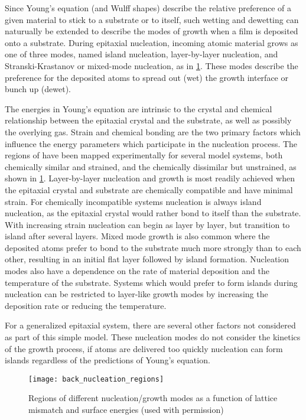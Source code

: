Since Young's equation (and Wulff shapes) describe the relative preference of a given material to stick to a substrate or to itself, such wetting and dewetting can naturually be extended to describe the modes of growth when a film is deposited onto a substrate. During epitaxial nucleation, incoming atomic material grows as one of three modes, named island nucleation, layer-by-layer nucleation, and Stranski-Krastanov or mixed-mode nucleation\cite{Venables1984}, as in \cref{fig:back_nucleation_regions}. These modes describe the preference for the deposited atoms to spread out (wet) the growth interface or bunch up (dewet).

 The energies in Young's equation are intrinsic to the crystal and chemical relationship between the epitaxial crystal and the substrate, as well as possibly the overlying gas. Strain and chemical bonding are the two primary factors which influence the energy parameters which participate in the nucleation process. The regions of have been mapped experimentally for several model systems, both chemically similar and strained, and the chemically dissimilar but unstrained, as shown in \cref{fig:back_nucleation_regions}. Layer-by-layer nucleation and growth is most readily achieved when the epitaxial crystal and substrate are chemically compatible and have minimal strain\cite{Venables1984}. For chemically incompatible systems nucleation is always island nucleation, as the epitaxial crystal would rather bond to itself than the substrate. With increasing strain nucleation can begin as layer by layer, but transition to island after several layers. Mixed mode growth is also common where the deposited atoms prefer to bond to the substrate much more strongly than to each other, resulting in an initial flat layer followed by island formation\cite{Venables1984}. Nucleation modes also have a dependence on the rate of material deposition and the temperature of the substrate. Systems which would prefer to form islands during nucleation can be restricted to layer-like growth modes by increasing the deposition rate or reducing the temperature.

For a generalized epitaxial system, there are several other factors not considered as part of this simple model. These nucleation modes do not consider the kinetics of the growth process, if atoms are delivered too quickly nucleation can form islands regardless of the predictions of Young's equation.
\begin{figure}
    \centering
    \texttt{[image: back\_nucleation\_regions]}
    \caption[Nucleation phase diagram of surface energy and strain]{\label{fig:back_nucleation_regions}Regions of different nucleation/growth modes as a function of lattice mismatch and surface energies\cite{ohring2001materials} (used with permission)}
\end{figure}

